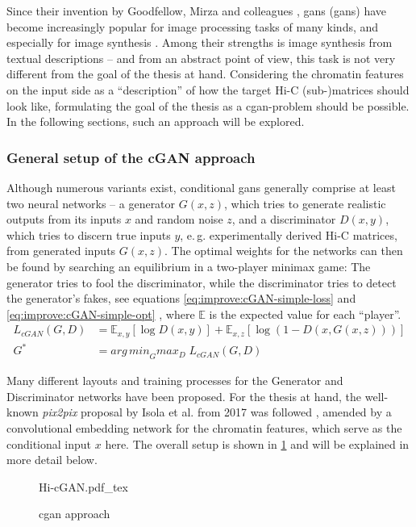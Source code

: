 Since their invention by Goodfellow, Mirza and colleagues \cite{Goodfellow2014, mirza2014},
\acrlong{gan}s (\acrshort{gan}s) have become increasingly popular for image processing tasks of many kinds,
and especially for image synthesis \cite{Wang2020}. 
Among their strengths is image synthesis from textual descriptions \cite{Reed2016,Zhang2019c,Zhu2019,Tao2020} --
and from an abstract point of view, this task is not very different from the goal of the thesis at hand.
Considering the chromatin features on the input side as a ``description'' of how the target Hi-C (sub-)matrices should look like,
formulating the goal of the thesis as a \acrshort{cgan}-problem should be possible.
In the following sections, such an approach will be explored.

\subsubsection{General setup of the cGAN approach}
Although numerous variants exist, conditional \acrshort{gan}s generally comprise at least two neural networks -- 
a generator $G(x,z)$, which tries to generate realistic outputs from its inputs $x$ and random noise $z$, and a discriminator $D(x,y)$,
which tries to discern true inputs $y$, e.\,g. experimentally derived Hi-C matrices, from generated inputs $G(x,z)$.
The optimal weights for the networks can then be found by searching an equilibrium in a two-player minimax game:
The generator tries to fool the discriminator, while the discriminator tries to detect the generator's fakes, 
see equations \ref{eq:improve:cGAN-simple-loss} and \ref{eq:improve:cGAN-simple-opt} \cite{Isola2017}, where $\mathbb{E}$ is the expected value for each ``player''.
\begin{align}
 L_\mathit{cGAN}(G, D) &= \mathbb{E}_{x,y}[\log D(x,y)] + \mathbb{E}_{x,z}[\log(1-D(x, G(x,z)))] \label{eq:improve:cGAN-simple-loss} \\
 G^* &=  \mathit{arg\,min}_G \mathit{max}_D \; L_\mathit{cGAN}(G, D) \label{eq:improve:cGAN-simple-opt}
\end{align}

Many different layouts and training processes for the Generator and Discriminator networks have been proposed.
For the thesis at hand, the well-known \emph{pix2pix} proposal by Isola et al. from 2017 was followed \cite{Isola2017}, 
amended by a convolutional embedding network for the chromatin features, which serve as the conditional input $x$ here.
The overall setup is shown in \cref{fig:improve:cGAN-approach} and will be explained in more detail below.
\begin{figure}[htbp]
 {Hi-cGAN.pdf_tex}
 \caption{\acrshort{cgan} approach} \label{fig:improve:cGAN-approach}
\end{figure}

